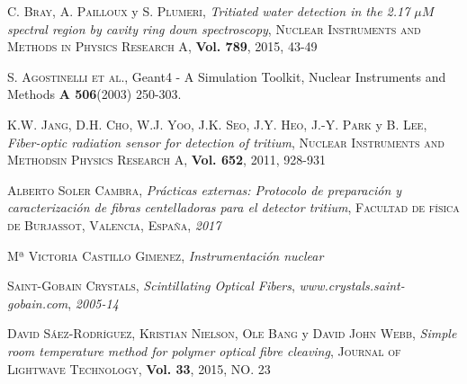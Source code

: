 \begin{thebibliography}{99}
 \textsc{C. Bray}, \textsc{A. Pailloux} y \textsc{S. Plumeri},
\textit{Tritiated water detection in the 2.17 $\mu M$ spectral region by cavity ring down spectroscopy}, \textsc{Nuclear Instruments and Methods in Physics Research A}, \textbf{Vol. 789}, \textsc{2015}, \textsc{43-49}

 {\textsc { S. Agostinelli et al.}, Geant4 - A Simulation Toolkit, Nuclear Instruments and Methods {\bf A 506}(2003) 250-303.}





 \textsc{K.W. Jang}, \textsc{D.H. Cho}, \textsc{W.J. Yoo}, \textsc{J.K. Seo}, \textsc{J.Y. Heo}, \textsc{J.-Y. Park} y \textsc{B. Lee},
\textit{Fiber-optic radiation sensor for detection of tritium}, \textsc{Nuclear Instruments and Methodsin Physics Research A}, \textbf{Vol. 652}, \textsc{2011}, \textsc{928-931}

 \textsc{Alberto Soler Cambra},
\textit{Prácticas externas: Protocolo de preparación y caracterización de fibras centelladoras para el detector tritium}, \textsc{Facultad de física de Burjassot, Valencia, España}, \textit{2017}

 \textsc{Mª Victoria Castillo Gimenez},
\textit{Instrumentación nuclear} 

 \textsc{Saint-Gobain Crystals},
\textit{Scintillating Optical Fibers}, \textit{www.crystals.saint-gobain.com}, \textit{2005-14}

 \textsc{David Sáez-Rodríguez}, \textsc{Kristian Nielson}, \textsc{Ole Bang} y \textsc{David John Webb},
\textit{Simple room temperature method for polymer optical fibre cleaving}, \textsc{Journal of Lightwave Technology}, \textbf{Vol. 33}, \textsc{2015}, \textsc{NO. 23}


\end{thebibliography}
